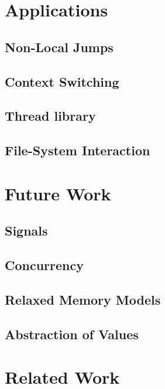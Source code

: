 \documentclass[sigplan,10pt,review,anonymous]{acmart}
\begin{document}

\section{Applications} %

\subsection{Non-Local Jumps}
\subsection{Context Switching}
\subsection{Thread library}
\subsection{File-System Interaction}


\section{Future Work} %

\subsection{Signals}
\subsection{Concurrency}
\subsection{Relaxed Memory Models}
\subsection{Abstraction of Values} %


\section{Related Work} %
\end{document}

